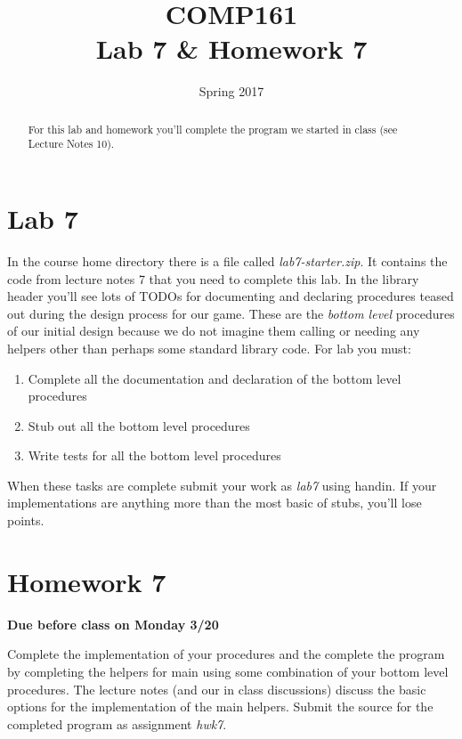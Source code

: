 \documentclass[nobib]{tufte-handout}
\title{COMP161 \\ Lab 7 \& Homework 7}
\author{}
\date{Spring 2017}
\begin{document}
\maketitle

\begin{abstract}
For this lab and homework you'll complete the program we started in class (see Lecture Notes 10).
\end{abstract}

\section{Lab 7}

In the course home directory there is a file called \textit{lab7-starter.zip}. It contains the code from lecture notes 7 that you need to complete this lab. In the library header you'll see lots of TODOs for documenting and declaring procedures teased out during the design process for our game. These are the \textit{bottom level} procedures of our initial design because we do not imagine them calling or needing any helpers other than perhaps some standard library code. For lab you must:
\begin{enumerate}
\item Complete all the documentation and declaration of the bottom level procedures
\item Stub out all the bottom level procedures
\item Write tests for all the bottom level procedures
\end{enumerate}
When these tasks are complete submit your work as \textit{lab7} using handin. If your implementations are anything more than the most basic of stubs, you'll lose points.

\section{Homework 7}

\begin{center}
\textbf{Due before class on Monday 3/20}
\end{center}

Complete the implementation of your procedures and the complete the program by completing the helpers for main using some combination of your bottom level procedures. The lecture notes (and our in class discussions) discuss the basic options for the implementation of the main helpers. Submit the source for the completed program as assignment \textit{hwk7}.
\end{document}
